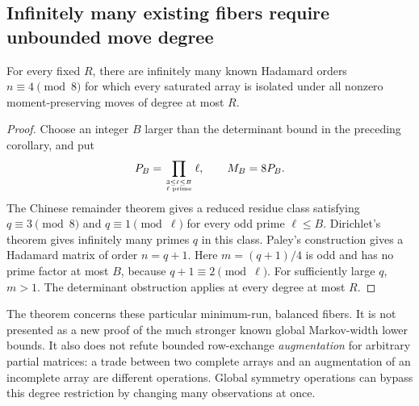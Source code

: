 \subsection{Infinitely many existing fibers require unbounded move degree}
\begin{theorem}\label{trd:unbounded}
For every fixed $R$, there are infinitely many known Hadamard orders
$n\equiv4\pmod8$ for which every saturated array is isolated under all
nonzero moment-preserving moves of degree at most $R$.
\end{theorem}
\begin{proof}
Choose an integer $B$ larger than the determinant bound in the preceding
corollary, and put
\[
 P_B=\prod_{3\le\ell\le B\atop\ell\text{ prime}}\ell,
 \qquad M_B=8P_B.
\]
The Chinese remainder theorem gives a reduced residue class satisfying
$q\equiv3\pmod8$ and $q\equiv1\pmod\ell$ for every odd prime
$\ell\le B$. Dirichlet's theorem gives infinitely many primes $q$ in
this class. Paley's construction gives a Hadamard matrix of order
$n=q+1$. Here $m=(q+1)/4$ is odd and has no prime factor at most $B$,
because $q+1\equiv2\pmod\ell$. For sufficiently large $q$, $m>1$.
The determinant obstruction applies at every degree at most $R$.
\end{proof}

The theorem concerns these particular minimum-run, balanced fibers. It
is not presented as a new proof of the much stronger known global
Markov-width lower bounds. It also does not refute bounded row-exchange
\emph{augmentation} for arbitrary partial matrices: a trade between two
complete arrays and an augmentation of an incomplete array are different
operations. Global symmetry operations can bypass this degree restriction
by changing many observations at once.

